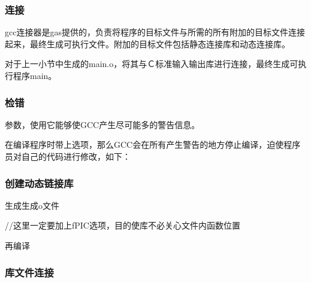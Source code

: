 \documentclass[letterpaper,12pt,english]{sphinxmanual}
\begin{document}
\subsubsection*{连接}

\begin{DUlineblock}{0em}
\item[] gcc连接器是gas提供的，负责将程序的目标文件与所需的所有附加的目标文件连接起来，最终生成可执行文件。附加的目标文件包括静态连接库和动态连接库。
\item[] 对于上一小节中生成的main.o，将其与Ｃ标准输入输出库进行连接，最终生成可执行程序main。
\end{DUlineblock}
\subsubsection*{检错}

\begin{DUlineblock}{0em}
\item[] 参数，使用它能够使GCC产生尽可能多的警告信息。
\item[] 
\item[] 在编译程序时带上选项，那么GCC会在所有产生警告的地方停止编译，迫使程序员对自己的代码进行修改，如下：
\item[] 
\end{DUlineblock}
\subsubsection*{创建动态链接库}

\begin{DUlineblock}{0em}
\item[] 生成生成o文件
\item[] 
//这里一定要加上\sphinxhyphen{}fPIC选项，目的使库不必关心文件内函数位置
\item[] 再编译
\item[] 
\end{DUlineblock}
\subsubsection*{库文件连接}
\end{document}
